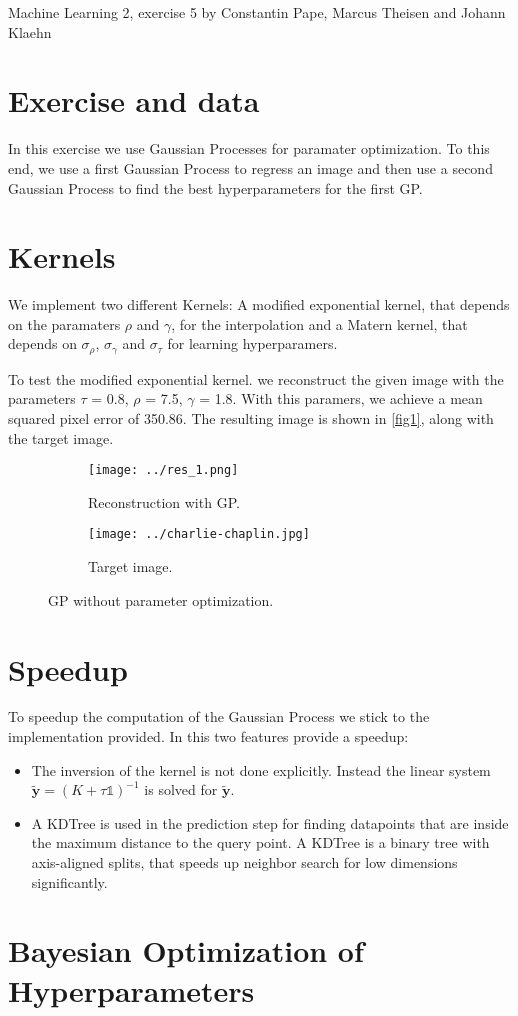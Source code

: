 \documentclass{article}
\begin{document}
Machine Learning 2, exercise 5 by Constantin Pape, Marcus Theisen and Johann Klaehn
 
\section{Exercise and data}

In this exercise we use Gaussian Processes for paramater optimization.
To this end, we use a first Gaussian Process to regress an image and then use a second Gaussian Process to find the best hyperparameters for the first GP.

\section{Kernels}

We implement two different Kernels: 
A modified exponential kernel, that depends on the paramaters $\rho$ and $\gamma$, for the 
interpolation and a Matern kernel, that depends on $\sigma_\rho$, $\sigma_\gamma$  and $\sigma_\tau$ for learning hyperparamers.

To test the modified exponential kernel. we reconstruct the given image with the parameters
$\tau$ = 0.8, $\rho$ = 7.5, $\gamma$ = 1.8.
With this paramers, we achieve a mean squared pixel error of 350.86. 
The resulting image is shown in \autoref{fig1}, along with the target image.

\begin{figure}[h]
	\centering
	\begin{subfigure}[b]{0.45\textwidth} 
		\texttt{[image: ../res\_1.png]}
		\caption{Reconstruction with GP.}
	\end{subfigure}
	\begin{subfigure}[b]{0.45\textwidth} 
		\texttt{[image: ../charlie-chaplin.jpg]}
		\caption{Target image.}
	\end{subfigure}
    \caption{GP without parameter optimization.}
	\label{fig1}
\end{figure}

\section{Speedup}

To speedup the computation of the Gaussian Process we stick to the implementation provided.
\newline
In this two features provide a speedup:
\begin{itemize}
    \item The inversion of the kernel is not done explicitly. Instead the linear system 
        $\mathbf{\tilde{y}} = (K + \tau \mathbb{1})^{-1}$ is solved for $\mathbf{\tilde{y}}$.
    \item A KDTree is used in the prediction step for finding datapoints that are inside
        the maximum distance to the query point.
        A KDTree is a binary tree with axis-aligned splits, that speeds up neighbor search for 
        low dimensions significantly.
\end{itemize}

\section{Bayesian Optimization of Hyperparameters}
\end{document}
